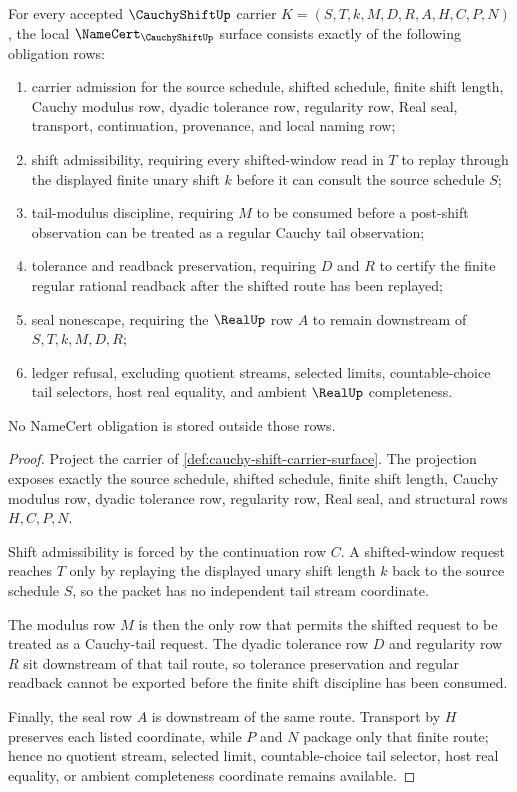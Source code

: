 \begin{theorem}
\label{thm:cauchy-shift-namecert-obligations}
For every accepted $\CauchyShiftUp$ carrier $K=(S,T,k,M,D,R,A,H,C,P,N)$, the local $\NameCert_{\CauchyShiftUp}$ surface consists exactly of the following obligation rows:
\begin{enumerate}
\item carrier admission for the source schedule, shifted schedule, finite shift length, Cauchy modulus row, dyadic tolerance row, regularity row, Real seal, transport, continuation, provenance, and local naming row;
\item shift admissibility, requiring every shifted-window read in $T$ to replay through the displayed finite unary shift $k$ before it can consult the source schedule $S$;
\item tail-modulus discipline, requiring $M$ to be consumed before a post-shift observation can be treated as a regular Cauchy tail observation;
\item tolerance and readback preservation, requiring $D$ and $R$ to certify the finite regular rational readback after the shifted route has been replayed;
\item seal nonescape, requiring the $\RealUp$ row $A$ to remain downstream of $S,T,k,M,D,R$;
\item ledger refusal, excluding quotient streams, selected limits, countable-choice tail selectors, host real equality, and ambient $\RealUp$ completeness.
\end{enumerate}
No NameCert obligation is stored outside those rows.
\end{theorem}
\begin{proof}
Project the carrier of \autoref{def:cauchy-shift-carrier-surface}. The projection exposes exactly the source schedule, shifted schedule, finite shift length, Cauchy modulus row, dyadic tolerance row, regularity row, Real seal, and structural rows $H,C,P,N$.

Shift admissibility is forced by the continuation row $C$. A shifted-window request reaches $T$ only by replaying the displayed unary shift length $k$ back to the source schedule $S$, so the packet has no independent tail stream coordinate.

The modulus row $M$ is then the only row that permits the shifted request to be treated as a Cauchy-tail request. The dyadic tolerance row $D$ and regularity row $R$ sit downstream of that tail route, so tolerance preservation and regular readback cannot be exported before the finite shift discipline has been consumed.

Finally, the seal row $A$ is downstream of the same route. Transport by $H$ preserves each listed coordinate, while $P$ and $N$ package only that finite route; hence no quotient stream, selected limit, countable-choice tail selector, host real equality, or ambient completeness coordinate remains available.
\end{proof}

